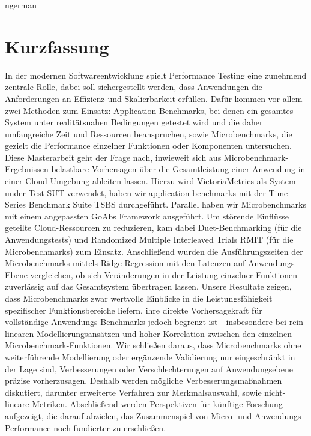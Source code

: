 \documentclass[a4paper, 11pt]{article}
\begin{document}
\clearpage
\begin{otherlanguage}
    {ngerman}
    \section*{Kurzfassung}
    In der modernen Softwareentwicklung spielt Performance Testing eine zunehmend zentrale Rolle, dabei soll sichergestellt werden, dass Anwendungen die Anforderungen an Effizienz und Skalierbarkeit erfüllen. Dafür kommen vor allem zwei Methoden zum Einsatz: Application Benchmarks, bei denen ein gesamtes System unter realitätsnahen Bedingungen getestet wird und die daher umfangreiche Zeit und Ressourcen beanspruchen, sowie Microbenchmarks, die gezielt die Performance einzelner Funktionen oder Komponenten untersuchen.
    Diese Masterarbeit geht der Frage nach, inwieweit sich aus Microbenchmark-Ergebnissen belastbare Vorhersagen über die Gesamtleistung einer Anwendung in einer Cloud-Umgebung ableiten lassen. Hierzu wird VictoriaMetrics als System under Test \ac{SUT} verwendet, haben wir application benchmarks mit der Time Series Benchmark Suite \ac{TSBS} durchgeführt. Parallel haben wir Microbenchmarks mit einem angepassten \ac{GoAbs} Framework ausgeführt. Um störende Einflüsse geteilte Cloud-Ressourcen zu reduzieren, kam dabei Duet-Benchmarking (für die Anwendungstests) und Randomized Multiple Interleaved Trials \ac{RMIT} (für die Microbenchmarks) zum Einsatz. Anschließend wurden die Ausführungszeiten der Microbenchmarks mittels Ridge-Regression mit den Latenzen auf Anwendungs-Ebene vergleichen, ob sich Veränderungen in der Leistung einzelner Funktionen zuverlässig auf das Gesamtsystem übertragen lassen. Unsere Resultate zeigen, dass Microbenchmarks zwar wertvolle Einblicke in die Leistungsfähigkeit spezifischer Funktionsbereiche liefern, ihre direkte Vorhersagekraft für vollständige Anwendungs-Benchmarks jedoch begrenzt ist—insbesondere bei rein linearen Modellierungsansätzen und hoher Korrelation zwischen den einzelnen Microbenchmark-Funktionen. Wir schließen daraus, dass Microbenchmarks ohne weiterführende Modellierung oder ergänzende Validierung nur eingeschränkt in der Lage sind, Verbesserungen oder Verschlechterungen auf Anwendungsebene präzise vorherzusagen. Deshalb werden mögliche Verbesserungsmaßnahmen diskutiert, darunter erweiterte Verfahren zur Merkmalsauswahl, sowie nicht-lineare Metriken. Abschließend werden Perspektiven für künftige Forschung aufgezeigt, die darauf abzielen, das Zusammenspiel von Micro- und Anwendungs-Performance noch fundierter zu erschließen.
\end{otherlanguage}
\end{document}
